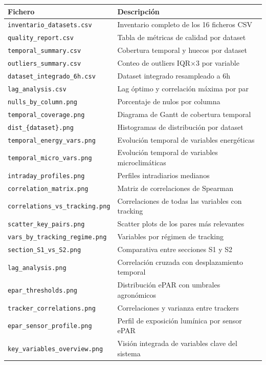\documentclass[12pt, a4paper]{article}
\begin{document}
\begin{longtable}{p{7.5cm} p{7cm}}
\toprule
\textbf{Fichero} & \textbf{Descripción} \\
\midrule
\endhead
\texttt{inventario\_datasets.csv}       & Inventario completo de los 16 ficheros CSV \\
\texttt{quality\_report.csv}            & Tabla de métricas de calidad por dataset \\
\texttt{temporal\_summary.csv}          & Cobertura temporal y huecos por dataset \\
\texttt{outliers\_summary.csv}          & Conteo de outliers IQR×3 por variable \\
\texttt{dataset\_integrado\_6h.csv}     & Dataset integrado resampleado a 6h \\
\texttt{lag\_analysis.csv}              & Lag óptimo y correlación máxima por par \\
\texttt{nulls\_by\_column.png}          & Porcentaje de nulos por columna \\
\texttt{temporal\_coverage.png}         & Diagrama de Gantt de cobertura temporal \\
\texttt{dist\_\{dataset\}.png}          & Histogramas de distribución por dataset \\
\texttt{temporal\_energy\_vars.png}     & Evolución temporal de variables energéticas \\
\texttt{temporal\_micro\_vars.png}      & Evolución temporal de variables microclimáticas \\
\texttt{intraday\_profiles.png}         & Perfiles intradiarios medianos \\
\texttt{correlation\_matrix.png}        & Matriz de correlaciones de Spearman \\
\texttt{correlations\_vs\_tracking.png} & Correlaciones de todas las variables con tracking \\
\texttt{scatter\_key\_pairs.png}        & Scatter plots de los pares más relevantes \\
\texttt{vars\_by\_tracking\_regime.png} & Variables por régimen de tracking \\
\texttt{section\_S1\_vs\_S2.png}        & Comparativa entre secciones S1 y S2 \\
\texttt{lag\_analysis.png}              & Correlación cruzada con desplazamiento temporal \\
\texttt{epar\_thresholds.png}           & Distribución ePAR con umbrales agronómicos \\
\texttt{tracker\_correlations.png}      & Correlaciones y varianza entre trackers \\
\texttt{epar\_sensor\_profile.png}      & Perfil de exposición lumínica por sensor ePAR \\
\texttt{key\_variables\_overview.png}   & Visión integrada de variables clave del sistema \\
\bottomrule
\end{longtable}
\end{document}

